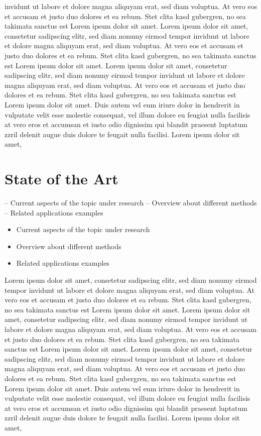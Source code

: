 \documentclass{isprs} %
\begin{document}
invidunt ut labore et dolore magna aliquyam erat, sed diam voluptua. At vero eos et accusam et justo duo dolores et ea rebum. Stet clita kasd gubergren, no sea takimata sanctus est Lorem ipsum dolor sit amet. Lorem ipsum dolor sit amet, consetetur sadipscing elitr, sed diam nonumy eirmod tempor invidunt ut labore et dolore magna aliquyam erat, sed diam voluptua. At vero eos et accusam et justo duo dolores et ea rebum. Stet clita kasd gubergren, no sea takimata sanctus est Lorem ipsum dolor sit amet. Lorem ipsum dolor sit amet, consetetur sadipscing elitr, sed diam nonumy eirmod tempor invidunt ut labore et dolore magna aliquyam erat, sed diam voluptua. At vero eos et accusam et justo duo dolores et ea rebum. Stet clita kasd gubergren, no sea takimata sanctus est Lorem ipsum dolor sit amet.   
Duis autem vel eum iriure dolor in hendrerit in vulputate velit esse molestie consequat, vel illum dolore eu feugiat nulla facilisis at vero eros et accumsan et iusto odio dignissim qui blandit praesent luptatum zzril delenit augue duis dolore te feugait nulla facilisi. Lorem ipsum dolor sit amet,


\section{State of the Art}\label{State of the Art}

– Current aspects of the topic under research
– Overview about different methods
– Related applications examples

\begin{itemize}
\setlength\itemsep{0em}\setlength\parskip{0em}\setlength\topsep{0em}\setlength\partopsep{0em}\setlength\parsep{0em} 
\item{Current aspects of the topic under research} 
\item{Overview about different methods}
\item{Related applications examples}
\end{itemize}

Lorem ipsum dolor sit amet, consetetur sadipscing elitr, sed diam nonumy eirmod tempor invidunt ut labore et dolore magna aliquyam erat, sed diam voluptua. At vero eos et accusam et justo duo dolores et ea rebum. Stet clita kasd gubergren, no sea takimata sanctus est Lorem ipsum dolor sit amet. Lorem ipsum dolor sit amet, consetetur sadipscing elitr, sed diam nonumy eirmod tempor invidunt ut labore et dolore magna aliquyam erat, sed diam voluptua. At vero eos et accusam et justo duo dolores et ea rebum. Stet clita kasd gubergren, no sea takimata sanctus est Lorem ipsum dolor sit amet. Lorem ipsum dolor sit amet, consetetur sadipscing elitr, sed diam nonumy eirmod tempor invidunt ut labore et dolore magna aliquyam erat, sed diam voluptua. At vero eos et accusam et justo duo dolores et ea rebum. Stet clita kasd gubergren, no sea takimata sanctus est Lorem ipsum dolor sit amet.   
Duis autem vel eum iriure dolor in hendrerit in vulputate velit esse molestie consequat, vel illum dolore eu feugiat nulla facilisis at vero eros et accumsan et iusto odio dignissim qui blandit praesent luptatum zzril delenit augue duis dolore te feugait nulla facilisi. Lorem ipsum dolor sit amet,
\end{document}
